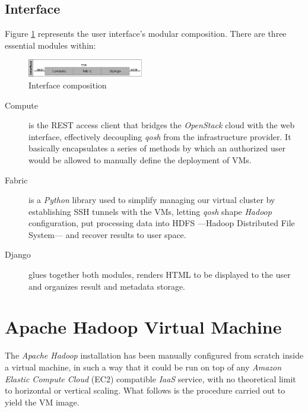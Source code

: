 \documentclass{sig-alternate}
\begin{document}
\subsection{Interface}
\noindent Figure \ref{fig:interface} represents the user interface's modular composition. There are three essential modules within:

\begin{figure}[tbp]
\centering
\includegraphics[width=0.45\textwidth]{img/003}
\caption{Interface composition}
\label{fig:interface}
\end{figure}

\begin{description}
 \item[Compute] is the REST access client that bridges the \emph{OpenStack} cloud with the web interface, effectively decoupling \emph{qosh} from the infrastructure provider. It basically encapsulates a series of methods by which an authorized user would be allowed to manually define the deployment of VMs.
 \item[Fabric] is a \emph{Python} library used to simplify managing our virtual cluster by establishing SSH tunnels with the VMs, letting \emph{qosh} shape \emph{Hadoop} configuration, put processing data into HDFS ---Hadoop Distributed File System--- and recover results to user space.
 \item[Django] glues together both modules, renders HTML to be displayed to the user and organizes result and metadata storage.
\end{description}



\section{Apache Hadoop Virtual Machine}
\noindent The \emph{Apache Hadoop} installation has been manually configured from scratch inside a virtual machine, in such a way that it could be run on top of any \emph{Amazon Elastic Compute Cloud} (EC2) compatible \emph{IaaS} service, with no theoretical limit to horizontal or vertical scaling. What follows is the procedure carried out to yield the VM image.
\end{document}
